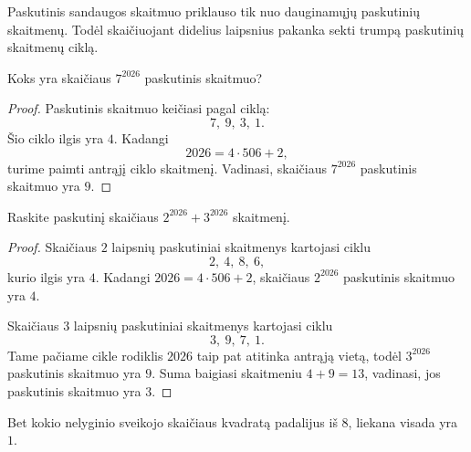 \documentclass[11pt,a4paper]{scrartcl}
\begin{document}
\begin{remark*}
Paskutinis sandaugos skaitmuo priklauso tik nuo dauginamųjų paskutinių skaitmenų. Todėl skaičiuojant didelius laipsnius pakanka sekti trumpą paskutinių skaitmenų ciklą.
\end{remark*}

\begin{example}
Koks yra skaičiaus \(7^{2026}\) paskutinis skaitmuo?
\end{example}

\begin{proof}
Paskutinis skaitmuo keičiasi pagal ciklą:
\[
7,\ 9,\ 3,\ 1.
\]
Šio ciklo ilgis yra $4$. Kadangi
\[
2026=4\cdot 506+2,
\]
turime paimti antrąjį ciklo skaitmenį. Vadinasi, skaičiaus \(7^{2026}\) paskutinis skaitmuo yra $9$.
\end{proof}

\begin{example}
Raskite paskutinį skaičiaus \(2^{2026}+3^{2026}\) skaitmenį.
\end{example}

\begin{proof}
Skaičiaus $2$ laipsnių paskutiniai skaitmenys kartojasi ciklu
\[
2,\ 4,\ 8,\ 6,
\]
kurio ilgis yra $4$. Kadangi $2026=4\cdot 506+2$, skaičiaus $2^{2026}$ paskutinis skaitmuo yra $4$.

Skaičiaus $3$ laipsnių paskutiniai skaitmenys kartojasi ciklu
\[
3,\ 9,\ 7,\ 1.
\]
Tame pačiame cikle rodiklis $2026$ taip pat atitinka antrąją vietą, todėl $3^{2026}$ paskutinis skaitmuo yra $9$.
Suma baigiasi skaitmeniu $4+9=13$, vadinasi, jos paskutinis skaitmuo yra $3$.
\end{proof}

\vspace{0.5cm}


\begin{proposition}
Bet kokio nelyginio sveikojo skaičiaus kvadratą padalijus iš $8$, liekana visada yra $1$.
\end{proposition}
\end{document}
